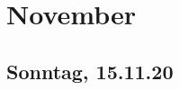 \documentclass[../main.tex]{subfiles}
\begin{document}
	\section{November}
	
	\subsection{Sonntag, 15.11.20}
\end{document}
